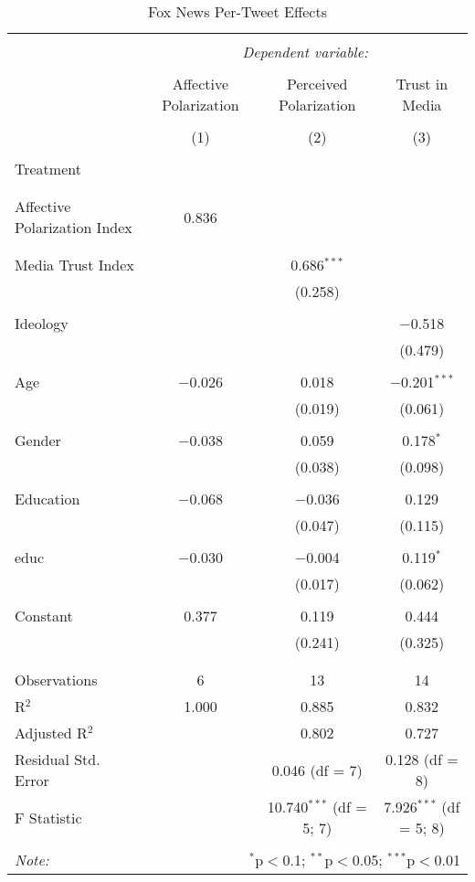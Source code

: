 
\begin{table}[!htbp] \centering 
  \caption{Fox News Per-Tweet Effects} 
  \label{} 
\begin{tabular}{@{\extracolsep{5pt}}lccc} 
\\[-1.8ex]\hline 
\hline \\[-1.8ex] 
 & \multicolumn{3}{c}{\textit{Dependent variable:}} \\ 
\cline{2-4} 
\\[-1.8ex] & Affective Polarization & Perceived Polarization & Trust in Media \\ 
\\[-1.8ex] & (1) & (2) & (3)\\ 
\hline \\[-1.8ex] 
 Treatment &  &  &  \\ 
  &  &  &  \\ 
  & & & \\ 
 Affective Polarization Index & 0.836 &  &  \\ 
  &  &  &  \\ 
  & & & \\ 
 Media Trust Index &  & 0.686$^{***}$ &  \\ 
  &  & (0.258) &  \\ 
  & & & \\ 
 Ideology &  &  & $-$0.518 \\ 
  &  &  & (0.479) \\ 
  & & & \\ 
 Age & $-$0.026 & 0.018 & $-$0.201$^{***}$ \\ 
  &  & (0.019) & (0.061) \\ 
  & & & \\ 
 Gender & $-$0.038 & 0.059 & 0.178$^{*}$ \\ 
  &  & (0.038) & (0.098) \\ 
  & & & \\ 
 Education & $-$0.068 & $-$0.036 & 0.129 \\ 
  &  & (0.047) & (0.115) \\ 
  & & & \\ 
 educ & $-$0.030 & $-$0.004 & 0.119$^{*}$ \\ 
  &  & (0.017) & (0.062) \\ 
  & & & \\ 
 Constant & 0.377 & 0.119 & 0.444 \\ 
  &  & (0.241) & (0.325) \\ 
  & & & \\ 
\hline \\[-1.8ex] 
Observations & 6 & 13 & 14 \\ 
R$^{2}$ & 1.000 & 0.885 & 0.832 \\ 
Adjusted R$^{2}$ &  & 0.802 & 0.727 \\ 
Residual Std. Error &  & 0.046 (df = 7) & 0.128 (df = 8) \\ 
F Statistic &  & 10.740$^{***}$ (df = 5; 7) & 7.926$^{***}$ (df = 5; 8) \\ 
\hline 
\hline \\[-1.8ex] 
\textit{Note:}  & \multicolumn{3}{r}{$^{*}$p$<$0.1; $^{**}$p$<$0.05; $^{***}$p$<$0.01} \\ 
\end{tabular} 
\end{table} 
